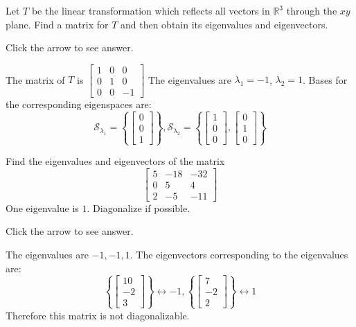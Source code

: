 \documentclass{ximera}
\begin{document}
\begin{problem}\label{prb:8.19} Let $T$ be the linear transformation which reflects all vectors in $
\mathbb{R}^{3}$ through the $xy$ plane. Find a matrix for $T$ and then
obtain its eigenvalues and eigenvectors.

Click the arrow to see answer.
\begin{expandable}
The matrix of $T$ is $\left[
\begin{array}{rrr}
1 & 0 & 0 \\
0 & 1 & 0 \\
0 & 0 & -1
\end{array}
\right]$
The eigenvalues are $\lambda_1=-1$, $\lambda_2=1$.  Bases for the corresponding eigenspaces are:
\[
\mathcal{S}_{\lambda_1}=\left\{
\begin{bmatrix}
0 \\
0 \\
1
\end{bmatrix} \right\}, \mathcal{S}_{\lambda_2}=\left\{
\begin{bmatrix}
1 \\
0 \\
0
\end{bmatrix}
 ,
\begin{bmatrix}
0 \\
1 \\
0
\end{bmatrix} \right\}
\]
\end{expandable}
\end{problem}

\begin{problem}\label{prb:8.20} Find the eigenvalues and eigenvectors of the matrix
\begin{equation*}
\left[
\begin{array}{rrr}
5 & -18 & -32 \\
0 & 5 & 4 \\
2 & -5 & -11
\end{array}
\right]
\end{equation*}
One eigenvalue is $1.$ Diagonalize if possible.

Click the arrow to see answer.
\begin{expandable}
The eigenvalues are $-1, -1, 1$. The eigenvectors corresponding to the eigenvalues are:
\[
\left\{ \left[
\begin{array}{c}
10 \\
-2 \\
3
\end{array}
\right] \right\} \leftrightarrow -1,  \left\{ \left[
\begin{array}{c}
7 \\
-2 \\
2
\end{array}
\right] \right\} \leftrightarrow 1
\]
Therefore this matrix is not diagonalizable.
\end{expandable}
\end{problem}
\end{document}
